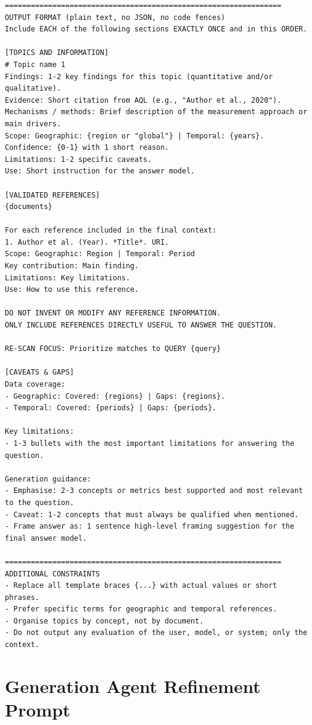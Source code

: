 \begin{lstlisting}[style=promptstyle,
caption={Refinement Agent prompt -- no-ontology version variant (full).},
label={lst:refinement-prompt-no-ontology}]
================================================================
OUTPUT FORMAT (plain text, no JSON, no code fences)
Include EACH of the following sections EXACTLY ONCE and in this ORDER.

[TOPICS AND INFORMATION]
# Topic name 1
Findings: 1-2 key findings for this topic (quantitative and/or qualitative).
Evidence: Short citation from AQL (e.g., "Author et al., 2020").
Mechanisms / methods: Brief description of the measurement approach or main drivers.
Scope: Geographic: {region or "global"} | Temporal: {years}.
Confidence: {0-1} with 1 short reason.
Limitations: 1-2 specific caveats.
Use: Short instruction for the answer model.

[VALIDATED REFERENCES]
{documents}

For each reference included in the final context:
1. Author et al. (Year). *Title*. URI.
Scope: Geographic: Region | Temporal: Period
Key contribution: Main finding.
Limitations: Key limitations.
Use: How to use this reference.

DO NOT INVENT OR MODIFY ANY REFERENCE INFORMATION.
ONLY INCLUDE REFERENCES DIRECTLY USEFUL TO ANSWER THE QUESTION.

RE-SCAN FOCUS: Prioritize matches to QUERY {query}

[CAVEATS & GAPS]
Data coverage:
- Geographic: Covered: {regions} | Gaps: {regions}.
- Temporal: Covered: {periods} | Gaps: {periods}.

Key limitations:
- 1-3 bullets with the most important limitations for answering the question.

Generation guidance:
- Emphasise: 2-3 concepts or metrics best supported and most relevant to the question.
- Caveat: 1-2 concepts that must always be qualified when mentioned.
- Frame answer as: 1 sentence high-level framing suggestion for the final answer model.

================================================================
ADDITIONAL CONSTRAINTS
- Replace all template braces {...} with actual values or short phrases.
- Prefer specific terms for geographic and temporal references.
- Organise topics by concept, not by document.
- Do not output any evaluation of the user, model, or system; only the context.
\end{lstlisting}

\section{Generation Agent Refinement Prompt}\label{app:prompt-generation}

